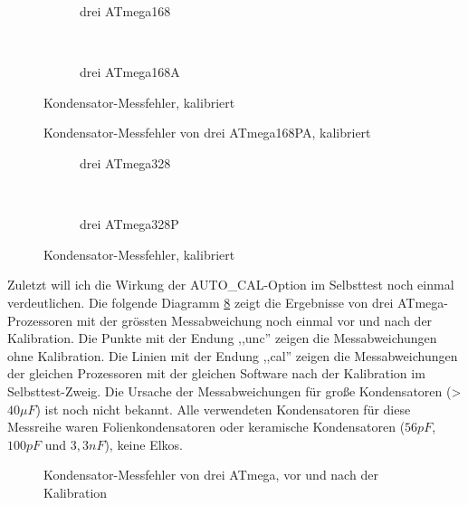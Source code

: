 \begin{figure}[H]
  \begin{subfigure}[b]{9cm}
    \centering
    \resizebox{9cm}{!}{}
    \caption{drei ATmega168}
    \label{fig:mega168cal}
  \end{subfigure}
  ~
  \begin{subfigure}[b]{9cm}
    \centering
    \resizebox{9cm}{!}{}
    \caption{drei ATmega168A}
    \label{fig:mega168Acal}
  \end{subfigure}
  \caption{Kondensator-Messfehler, kalibriert}
\end{figure}

\begin{figure}[H]
\centering

\caption{Kondensator-Messfehler von drei ATmega168PA, kalibriert}
\label{fig:mega168PAcal}
\end{figure}

\begin{figure}[H]
  \begin{subfigure}[b]{9cm}
    \centering
    \resizebox{9cm}{!}{}
    \caption{drei ATmega328}
    \label{fig:mega328cal}
  \end{subfigure}
  ~
  \begin{subfigure}[b]{9cm}
    \centering
    \resizebox{9cm}{!}{}
    \caption{drei ATmega328P}
    \label{fig:mega328Pcal}
  \end{subfigure}
  \caption{Kondensator-Messfehler, kalibriert}
\end{figure}

Zuletzt will ich die Wirkung der AUTO\_CAL-Option im Selbsttest noch einmal verdeutlichen.
Die folgende Diagramm \ref{fig:MegaAuto} zeigt die Ergebnisse von drei ATmega-Prozessoren 
mit der grössten Messabweichung noch einmal vor und nach der Kalibration.
Die Punkte mit der Endung ,,unc'' zeigen die Messabweichungen ohne Kalibration.
Die Linien mit der Endung ,,cal'' zeigen die Messabweichungen der gleichen Prozessoren
mit der gleichen Software nach der Kalibration im Selbsttest-Zweig.
Die Ursache der Messabweichungen für große Kondensatoren (\textgreater\(40\mu F\)) ist
noch nicht bekannt. Alle verwendeten Kondensatoren für diese Messreihe waren
Folienkondensatoren oder keramische Kondensatoren (\(56pF\), \(100pF\) und \(3,3nF\)), keine Elkos.

\begin{figure}[H]
\centering

\caption{Kondensator-Messfehler von drei ATmega, vor und nach der Kalibration}
\label{fig:MegaAuto}
\end{figure}

